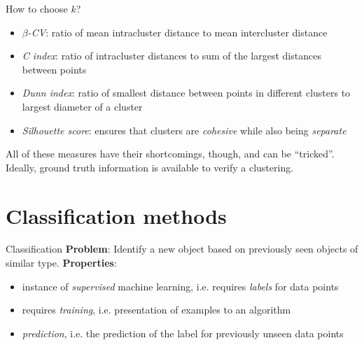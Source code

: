 \documentclass[aspectratio=169]{beamer}
\begin{document}
  \begin{frame}{How to choose $k$?}
    \begin{itemize}
      \item \emph{$\beta$-CV}: ratio of mean intracluster distance to mean intercluster distance
      \item \emph{C index}: ratio of intracluster distances to sum of the largest distances between points
      \item \emph{Dunn index}: ratio of smallest distance between points in different clusters to largest diameter of a cluster
      \item \emph{Silhouette score}: ensures that clusters are \emph{cohesive} while also being \emph{separate}
    \end{itemize}
    \vfill
    All of these measures have their shortcomings, though, and can be
    ``tricked''. Ideally, ground truth information is available to
    verify a clustering.
  \end{frame}

  \section{Classification methods}

\begin{frame}{Classification}
    \textbf{Problem}:
    \newline
    Identify a new object based on previously seen objects of similar type.
    \newline\newline
    \noindent
    \textbf{Properties}:
    \begin{itemize}
        \item instance of \textit{supervised} machine learning, i.e. requires \textit{labels} for data points
        \item requires \textit{training}, i.e. presentation of examples to an algorithm
        \item \textit{prediction}, i.e. the prediction of the label for previously unseen data points
    \end{itemize}
\end{frame}
\end{document}
